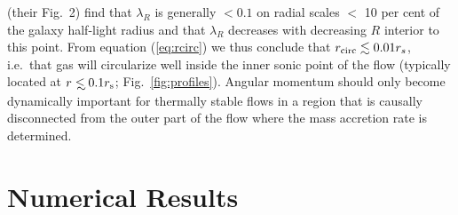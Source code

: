 \documentclass[usenatbib,fleqn]{mn2e}
\newcommand\lsim{\mathrel{\rlap{\lower4pt\hbox{\hskip1pt$\sim$}}
    \raise1pt\hbox{$<$}}}
\begin{document}
\citet{EmsellemCappellari+:2007a} (their Fig.~2) find that $\lambda_R$
is generally $< 0.1$ on radial scales $<$ 10 per cent of the galaxy
half-light radius and that $\lambda_R$ decreases with decreasing $R$ interior to this point.  From equation (\ref{eq:rcirc}) we thus conclude that $r_{\rm
  circ} \lesssim 0.01r_{s}$, i.e.~that gas will circularize well
inside the inner sonic point of the flow (typically located at $r\lsim
0.1r_{\rm s}$; Fig.~\ref{fig:profiles}).  Angular momentum should only
become dynamically important for thermally stable flows in a region
that is causally disconnected from the outer part of the flow where
the mass accretion rate is determined.


\section{Numerical Results}
\label{sec:numerical}
\end{document}
